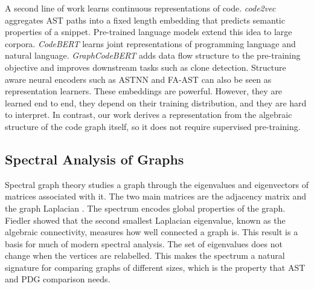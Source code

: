 \documentclass[authoryear,final,5p,times,twocolumn]{elsarticle}
\theoremstyle{plain}
\begin{document}
A second line of work learns continuous representations of code.
\emph{code2vec} \cite{alon2019code2vec} aggregates AST paths into a fixed
length embedding that predicts semantic properties of a snippet.
Pre-trained language models extend this idea to large corpora.
\emph{CodeBERT} \cite{feng2020codebert} learns joint representations of
programming language and natural language. \emph{GraphCodeBERT}
\cite{guo2021graphcodebert} adds data flow structure to the pre-training
objective and improves downstream tasks such as clone detection.
Structure aware neural encoders such as ASTNN \cite{zhang2019astnn} and
FA-AST \cite{wang2020faast} can also be seen as representation learners.
These embeddings are powerful. However, they are learned end to end, they
depend on their training distribution, and they are hard to interpret. In
contrast, our work derives a representation from the algebraic structure
of the code graph itself, so it does not require supervised pre-training.

\subsection{Spectral Analysis of Graphs}
\label{subsec:spectral}

Spectral graph theory studies a graph through the eigenvalues and
eigenvectors of matrices associated with it. The two main matrices are the
adjacency matrix and the graph Laplacian
\cite{chung1997spectral,mohar1991laplacian}. The spectrum encodes global
properties of the graph. Fiedler \cite{fiedler1973algebraic} showed that
the second smallest Laplacian eigenvalue, known as the algebraic
connectivity, measures how well connected a graph is. This result is a
basis for much of modern spectral analysis. The set of eigenvalues does
not change when the vertices are relabelled. This makes the spectrum a
natural signature for comparing graphs of different sizes, which is the
property that AST and PDG comparison needs.
\end{document}
